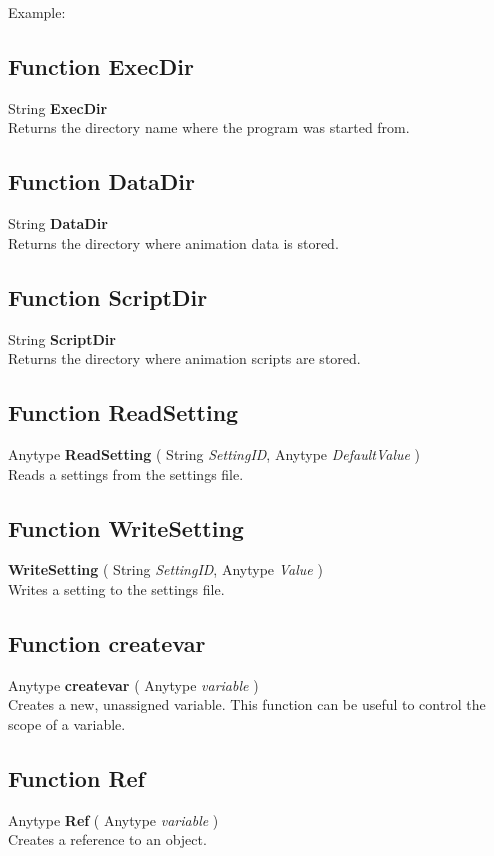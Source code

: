 Example:

\subsection{Function ExecDir \label{F:ExecDir}}
String \textbf{ExecDir} \\
Returns the directory name where the program was started from.

\subsection{Function DataDir \label{F:DataDir}}
String \textbf{DataDir} \\
Returns the directory where animation data is stored.

\subsection{Function ScriptDir \label{F:ScriptDir}}
String \textbf{ScriptDir} \\
Returns the directory where animation scripts are stored.

\subsection{Function ReadSetting \label{F:ReadSetting}}
Anytype \textbf{ReadSetting} ( String \textit{SettingID}, Anytype \textit{DefaultValue} ) \\
Reads a settings from the settings file.

\subsection{Function WriteSetting \label{F:WriteSetting}}
\textbf{WriteSetting} ( String \textit{SettingID}, Anytype \textit{Value} ) \\
Writes a setting to the settings file.

\subsection{Function createvar \label{F:createvar}}
Anytype \textbf{createvar} ( Anytype \textit{variable} ) \\
Creates a new, unassigned variable. This function can be useful to control the scope of a variable.

\subsection{Function Ref \label{F:Ref}}
Anytype \textbf{Ref} ( Anytype \textit{variable} ) \\
Creates a reference to an object.

